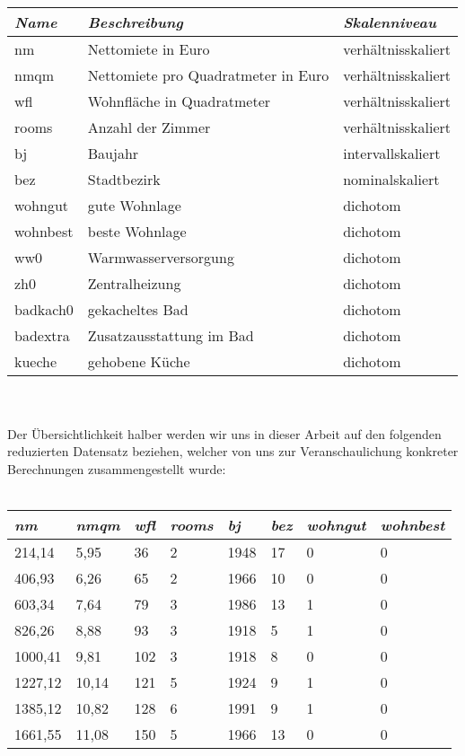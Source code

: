 \\

\noindent \begin{tabular}[ht]{|l|l|l|}
	\hline
	\textit{Name} & \textit{Beschreibung} & \textit{Skalenniveau}\\
	\hline \hline
	nm & Nettomiete in Euro & verhältnisskaliert\\ \hline
	nmqm & Nettomiete pro Quadratmeter in Euro & verhältnisskaliert\\ \hline
	wfl & Wohnfläche in Quadratmeter & verhältnisskaliert\\ \hline
	rooms & Anzahl der Zimmer & verhältnisskaliert\\ \hline
	bj & Baujahr & intervallskaliert\\ \hline
	bez & Stadtbezirk & nominalskaliert\\ \hline
	wohngut & gute Wohnlage & dichotom\\ \hline
	wohnbest & beste Wohnlage & dichotom\\ \hline
	ww0 & Warmwasserversorgung & dichotom\\ \hline
	zh0 & Zentralheizung & dichotom\\ \hline
	badkach0 & gekacheltes Bad & dichotom\\ \hline
	badextra & Zusatzausstattung im Bad & dichotom\\ \hline
	kueche & gehobene Küche & dichotom\\
	\hline
\end{tabular}\\\\

\noindent Der Übersichtlichkeit halber werden wir uns in dieser Arbeit auf den folgenden reduzierten Datensatz beziehen, welcher von uns zur Veranschaulichung konkreter Berechnungen zusammengestellt wurde:\\

\\

\noindent \begin{tabular}[ht]{|l|l|l|l|l|l|l|l|}
	\hline
	\textit{nm} & \textit{nmqm} & \textit{wfl} & \textit{rooms} & \textit{bj} & \textit{bez} & \textit{wohngut} & \textit{wohnbest}\\
	\hline \hline
	214,14 & 5,95 & 36 & 2 & 1948 & 17 & 0 & 0\\ \hline
	406,93 & 6,26 & 65 & 2 & 1966 & 10 & 0 & 0\\ \hline
	603,34 & 7,64 & 79 & 3 & 1986 & 13 & 1 & 0\\ \hline
	826,26 & 8,88 & 93 & 3 & 1918 & 5 & 1 &0\\ \hline
	1000,41 & 9,81 & 102 & 3 & 1918 & 8 & 0 & 0\\ \hline
	1227,12 & 10,14 & 121 & 5 & 1924 & 9 & 1 & 0\\ \hline
	1385,12 & 10,82 & 128 & 6 & 1991 & 9 & 1 & 0\\ \hline
	1661,55 & 11,08 & 150 & 5 & 1966 & 13 & 0 & 0\\
	\hline
\end{tabular}